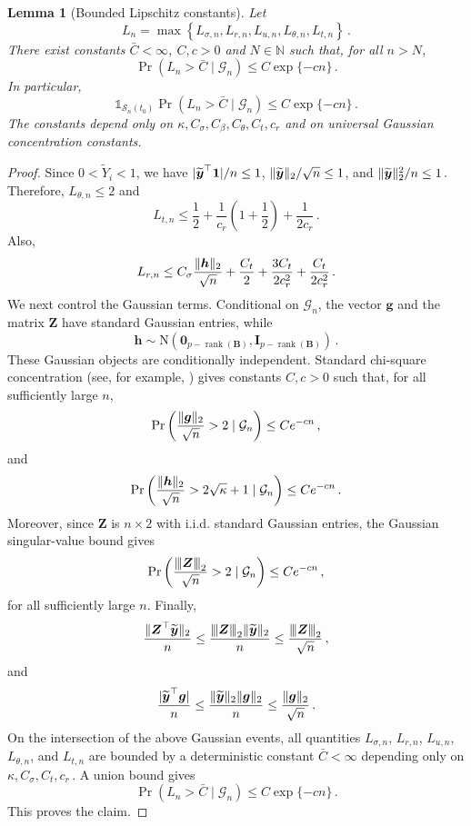 \documentclass{article}
\makeatletter
\newtheorem{lemma}{Lemma}
\theoremstyle{definition}
\newcommand{\vnorm}[1]{%
	\ensuremath{%
		\if@display
		\left\| #1 \right\|
		\else
		\| #1 \|
		\fi
	}%
}
\newcommand{\abs}[1]{%
	\ensuremath{%
		\if@display
		\left| #1 \right|
		\else
		\lvert #1 \rvert
		\fi
	}%
}
\newcommand{\mnorm}[1]{{\left\vert\kern-0.25ex\left\vert\kern-0.25ex\left\vert #1
		\right\vert\kern-0.25ex\right\vert\kern-0.25ex\right\vert}}
\newcommand*{\bb}{\boldsymbol}
\def\bh{\bb{h}}
\def\bg{\bb{g}}
\def\Ytil{\widetilde{Y}}
\def\bYtil{\widetilde{\bb{y}}}
\newcommand{\rank}{\operatorname{rank}}
\makeatother
\begin{document}
\begin{bibunit}
\begin{lemma}[Bounded Lipschitz constants]
	\label{lemma:ao_lipschitz_constants}
	Let
	$$
		L_n
		=
		\max
		\left\{
			L_{\sigma,n},
			L_{r,n},
			L_{u,n},
			L_{\theta,n},
			L_{t,n}
		\right\}\,.
	$$
	There exist constants $\bar C<\infty$, $C,c>0$ and $N\in\mathbb N$ such that, for all $n>N$,
	$$
		\Pr\left(
			L_n>\bar C
			\mid
			\mathcal G_n
		\right)
		\leq
		C\exp\{-cn\}\,.
	$$
	In particular,
	$$
		\mathds{1}_{\mathcal S_n(t_0)}
		\Pr\left(
			L_n>\bar C
			\mid
			\mathcal G_n
		\right)
		\leq
		C\exp\{-cn\}\,.
	$$
	The constants depend only on $\kappa,C_\sigma,C_\beta,C_\theta,C_t,c_r$
	and on universal Gaussian concentration constants.
\end{lemma}
\begin{proof}
	Since $0<\Ytil_i<1$, we have $\abs{\bYtil^\top\bb1}/n\leq1$, $\vnorm{\bYtil}_2/\sqrt n\leq1$, and $\vnorm{\bYtil}_2^2/n\leq1\,.$
	Therefore, $L_{\theta,n}\leq2$
	and
	$$
		L_{t,n}
		\leq
		\frac12
		+
		\frac1{c_r}
		\left(
			1+\frac12
		\right)
		+
		\frac1{2c_r}\,.
	$$
	Also,
	$$
		L_{r,n}
		\leq
		C_\sigma\frac{\vnorm{\bh}_2}{\sqrt n}
		+
		\frac{C_t}{2}
		+
		\frac{3C_t}{2c_r^2}
		+
		\frac{C_t}{2c_r^2}\,.
	$$
	We next control the Gaussian terms. Conditional on $\mathcal G_n$, the vector $\bg$ and the matrix $\bb Z$
	have standard Gaussian entries, while
	$$
		\bh
		\sim
		\mathrm N\left(
			\bb0_{p-\rank(\bb B)},
			\bb I_{p-\rank(\bb B)}
		\right)\,.
	$$
	These Gaussian objects are conditionally independent. Standard chi-square concentration
	(see, for example, \citealt[][Theorem~3.1.1]{vershynin:2018}) gives
	constants $C,c>0$ such that, for all sufficiently large $n$,
	$$
		\Pr\left(
			\frac{\vnorm{\bg}_2}{\sqrt n}>2
			\mid
			\mathcal G_n
		\right)
		\leq
		Ce^{-cn}\,,
	$$
	and
	$$
		\Pr\left(
			\frac{\vnorm{\bh}_2}{\sqrt n}>2\sqrt{\kappa}+1
			\mid
			\mathcal G_n
		\right)
		\leq
		Ce^{-cn}\,.
	$$
	Moreover, since $\bb Z$ is $n\times2$ with i.i.d. standard Gaussian entries, the Gaussian singular-value bound gives
	$$
		\Pr\left(
			\frac{\mnorm{\bb Z}_2}{\sqrt n}>2
			\mid
			\mathcal G_n
		\right)
		\leq
		Ce^{-cn}\,,
	$$
	for all sufficiently large $n$. Finally,
	$$
		\frac{\vnorm{\bb Z^\top\bYtil}_2}{n}
		\leq
		\frac{\mnorm{\bb Z}_2\vnorm{\bYtil}_2}{n}
		\leq
		\frac{\mnorm{\bb Z}_2}{\sqrt n}\,,
	$$
	and
	$$
		\frac{\abs{\bYtil^\top\bg}}{n}
		\leq
		\frac{\vnorm{\bYtil}_2\vnorm{\bg}_2}{n}
		\leq
		\frac{\vnorm{\bg}_2}{\sqrt n}\,.
	$$
	On the intersection of the above Gaussian events, all quantities $L_{\sigma,n}$, $L_{r,n}$, $L_{u,n}$, $L_{\theta,n}$, and $L_{t,n}$ are bounded by a deterministic constant $\bar C<\infty$ depending only on $\kappa,C_\sigma,C_t,c_r\,.$
	A union bound gives
	$$
		\Pr\left(
			L_n>\bar C
			\mid
			\mathcal G_n
		\right)
		\leq
		C\exp\{-cn\}\,.
	$$
	This proves the claim.
\end{proof}


\end{bibunit}
\end{document}
